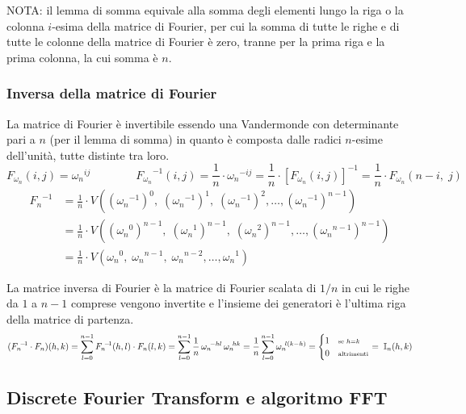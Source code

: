 \noindent
NOTA: il lemma di somma equivale alla somma degli elementi lungo la riga o la colonna \(i\)-esima della matrice di Fourier,
per cui la somma di tutte le righe e di tutte le colonne della matrice di Fourier è zero, tranne per la prima riga e la prima
colonna, la cui somma è \(n\).

\subsubsection*{Inversa della matrice di Fourier}
La matrice di Fourier è invertibile essendo una Vandermonde con determinante pari a \(n\) (per il lemma di somma) in quanto è
composta dalle radici \(n\)-esime dell'unità, tutte distinte tra loro.
\[F_{\omega_n}(i,j) = {\omega_n}^{ij} \qquad\qquad {F_{\omega_n}\!}^{-1}(i,j) = \frac{1}{n} \cdot {\omega_n}^{-ij} = \frac{1}{n} \cdot [F_{\omega_n}(i,j)]^{-1} = \frac{1}{n} \cdot F_{\omega_n}(n-i, \; j)\]
\vspace{-12pt}
\begin{align*}
	{F_n}^{-1} &= \frac{1}{n} \cdot V \!\left( \left({\omega_n}^{-1}\right)^0, \; \left({\omega_n}^{-1}\right)^1, \; \left({\omega_n}^{-1}\right)^2, \dots, \left({\omega_n}^{-1}\right)^{n-1} \right) \\
	&= \frac{1}{n} \cdot V \!\left( \left({\omega_n}^0\right)^{n-1}, \; \left({\omega_n}^1\right)^{n-1}, \; \left({\omega_n}^2\right)^{n-1}, \dots, \left({\omega_n}^{n-1}\right)^{n-1} \right) \\
	&= \frac{1}{n} \cdot V \!\left( {\omega_n}^0, \; {\omega_n}^{n-1}, \; {\omega_n}^{n-2}, \dots, {\omega_n}^1 \right)
\end{align*}

\noindent
La matrice inversa di Fourier è la matrice di Fourier scalata di \(1/n\) in cui le righe da \(1\) a \(n\!-\!1\) comprese
vengono invertite e l'insieme dei generatori è l'ultima riga della matrice di partenza.
\[({F_n\!}^{-\!1} \cdot F_n)(h, k) = \sum_{l=0}^{n-1} {F_n\!}^{-\!1}(h, l) \cdot F_n(l, k) = \sum_{l=0}^{n-1} \frac{1}{n} \, {\omega_n\!}^{-hl} \, {\omega_n\!}^{hk}= \frac{1}{n} \sum_{l=0}^{n-1} {\omega_n\!}^{l(k-h)} = \begin{cases} 1 & {\scriptstyle \text{se } h = k} \\ 0 & \text{\scriptsize altrimenti} \end{cases} = \; \mathbb{I}_n(h,k)\]

\subsection{Discrete Fourier Transform e algoritmo FFT}
